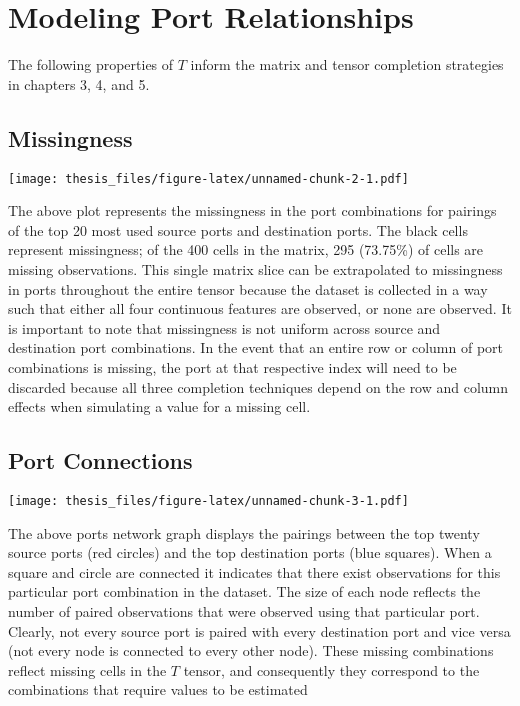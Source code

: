 \documentclass[12pt,twoside]{dukestatscithesis}
\theoremstyle{definition}
\theoremstyle{definition}
\theoremstyle{definition}
\theoremstyle{remark}
\begin{document}
\chapter{Modeling Port Relationships}\label{modeling-port-relationships}

The following properties of \(T\) inform the matrix and tensor
completion strategies in chapters 3, 4, and 5.

\section{Missingness}\label{missingness}

\texttt{[image: thesis\_files/figure-latex/unnamed-chunk-2-1.pdf]}

The above plot represents the missingness in the port combinations for
pairings of the top 20 most used source ports and destination ports. The
black cells represent missingness; of the 400 cells in the matrix, 295
(73.75\%) of cells are missing observations. This single matrix slice
can be extrapolated to missingness in ports throughout the entire tensor
because the dataset is collected in a way such that either all four
continuous features are observed, or none are observed. It is important
to note that missingness is not uniform across source and destination
port combinations. In the event that an entire row or column of port
combinations is missing, the port at that respective index will need to
be discarded because all three completion techniques depend on the row
and column effects when simulating a value for a missing cell.

\section{Port Connections}\label{port-connections}

\texttt{[image: thesis\_files/figure-latex/unnamed-chunk-3-1.pdf]}

The above ports network graph displays the pairings between the top
twenty source ports (red circles) and the top destination ports (blue
squares). When a square and circle are connected it indicates that there
exist observations for this particular port combination in the dataset.
The size of each node reflects the number of paired observations that
were observed using that particular port. Clearly, not every source port
is paired with every destination port and vice versa (not every node is
connected to every other node). These missing combinations reflect
missing cells in the \(T\) tensor, and consequently they correspond to
the combinations that require values to be estimated
\end{document}
